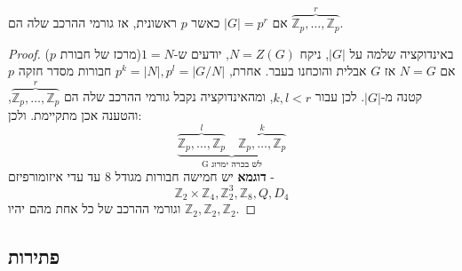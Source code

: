 \documentclass{tstextbook}
\begin{document}
\begin{corollary}
אם \(|G|=p^r\) כאשר \(p\) ראשונית, אז גורמי ההרכב שלה הם \(\overbrace{ \mathbb{Z}_{p},\dots,\mathbb{Z} _p }^{ r }\).

\end{corollary}
\begin{proof}
באינדוקציה שלמה על \(|G|\), ניקח \(N=Z(G)\), יודעים ש-\(1=N\)(מרכז
של חבורת \(p\)) אם \(N=G\) אז \(G\) אבלית והוכחנו בעבר. אחרת, \(p^k=|N|,p^l=|G / N|\) חבורות מסדר חזקה \(p\) קטנה מ-\(|G|\). לכן עבור \(k,l <r\), ומהאינדוקציה נקבל גורמי ההרכב שלה הם \(\overbrace{ \mathbb{Z} _p, \dots, \mathbb{Z} _p }^{ r }\), והטענה אכן מתקיימת. ולכן:
$$\underbrace{ \overbrace{ \mathbb{Z} _{p},\dots , \mathbb{Z} _{p} }^{ l }\quad \overbrace{ \mathbb{Z} _{p},\dots,\mathbb{Z} _{p} }^{ k } }_{ \text{G לש בכרה ימרוג} }$$\textbf{דוגמא}
יש חמישה חבורות מגודל 8 עד עדי איזומורפיזם -
$$\mathbb{Z} _{2}\times \mathbb{Z} _{4},\mathbb{Z} _{2}^3, \mathbb{Z} _{8},Q, D_{4}$$
וגורמי ההרכב של כל אחת מהם יהיו \(\mathbb{Z} _2,\mathbb{Z} _2,\mathbb{Z} _2\).

\end{proof}
\subsection{פתירות}
\end{document}
